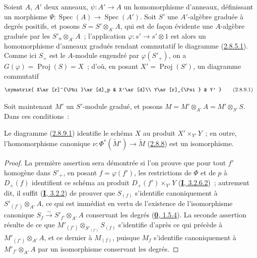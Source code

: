 \begin{env}[2.8.9]
\label{II.2.8.9-fr}
Soient $A$, $A'$ deux anneaux, $\psi:A'\to A$ un homomorphisme d'anneaux,
définissant un morphisme
$\Psi:\operatorname{Spec}(A)\to\operatorname{Spec}(A')$. Soit $S'$ une
$A'$-algèbre graduée à degrés positifs, et posons $S=S'\otimes_{A'}A$, qui
est de façon évidente une $A$-algèbre graduée par les $S'_n\otimes_{A'}A$~;
l'application $\varphi:s'\to s'\otimes1$ est alors un homomorphisme
d'anneaux gradués rendant commutatif le diagramme
(\hyperref[II.2.8.5.1-fr]{2.8.5.1}). Comme ici $S_+$ est le $A$-module
engendré par $\varphi(S'_+)$, on a $G(\varphi)=\operatorname{Proj}(S)=X$~;
d'où, en posant $X'=\operatorname{Proj}(S')$, un diagramme commutatif
\[
\label{II.2.8.9.1-fr}
  \xymatrix{
    X\ar[r]^{\Phi}\ar[d]_p & X'\ar[d]\\
    Y\ar[r]_{\Psi} & Y'
  }
\tag{2.8.9.1}
\]

Soit maintenant $M'$ un $S'$-module gradué, et posons
$M=M'\otimes_{A'}A=M'\otimes_{S'}S$. Dans ces conditions~:
\end{env}

\begin{proposition}[2.8.10]
\label{II.2.8.10-fr}
Le diagramme \textup{(\hyperref[II.2.8.9.1-fr]{2.8.9.1})} identifie le schéma $X$ au
produit $X'\times_{Y'}Y$~; en outre, l'homomorphisme canonique
$\nu:\Phi^*(\widetilde{M}')\to\widetilde{M}$
\textup{(\hyperref[II.2.8.8-fr]{2.8.8})} est un isomorphisme.
\end{proposition}

\begin{proof}
La première assertion sera démontrée si l'on prouve que pour tout $f'$
homogène dans $S'_+$, en posant $f=\varphi(f')$, les restrictions de $\Phi$
et de $p$ à $D_+(f)$ identifient ce schéma au produit
$D_+(f')\times_{Y'}Y$ (\hyperref[I.3.2.6.2-fr]{\textbf{I}, 3.2.6.2})~; autrement
dit, il suffit (\hyperref[I.3.2.2-fr]{\textbf{I}, 3.2.2}) de prouver que $S_{(f)}$
s'identifie canoniquement à $S'_{(f')}\otimes_{A'}A$, ce qui est immédiat
en vertu de l'existence de l'isomorphisme canonique
$S_f\xrightarrow{\sim}S'_{f'}\otimes_{A'}A$ conservant les degrés
(\hyperref[0.1.5.4-fr]{\textbf{0}, 1.5.4}). La seconde assertion résulte de ce que
$M'_{(f')}\otimes_{S'_{(f')}}S_{(f)}$ s'identifie d'après ce qui précède à
$M'_{(f')}\otimes_{A'}A$, et ce dernier à $M_{(f)}$, puisque $M_f$
s'identifie canoniquement à $M'_{f'}\otimes_{A'}A$ par un isomorphisme
conservant les degrés.
\end{proof}


